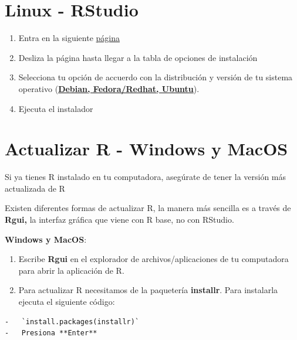 \documentclass[
  spanish,
  12pt,
  letterpaper,
  DIV=11,
  numbers=noendperiod]{scrreprt}
\providecommand{\tightlist}{%
  \setlength{\itemsep}{0pt}\setlength{\parskip}{0pt}}
\begin{document}
\section{Linux - RStudio}\label{linux---rstudio}

\begin{enumerate}
\def\labelenumi{\arabic{enumi}.}
\tightlist
\item
  Entra en la siguiente
  \href{https://posit.co/download/rstudio-desktop/\#download}{página}
\item
  Desliza la página hasta llegar a la tabla de opciones de instalación
\item
  Selecciona tu opción de accuerdo con la distribución y versión de tu
  sistema operativo (\ul{\textbf{Debian, Fedora/Redhat, Ubuntu}}).
\item
  Ejecuta el instalador
\end{enumerate}

\section{Actualizar R - Windows y
MacOS}\label{actualizar-r---windows-y-macos}

Si ya tienes R instalado en tu computadora, asegúrate de tener la
versión más actualizada de R

Existen diferentes formas de actualizar R, la manera más sencilla es a
través de \textbf{Rgui,} la interfaz gráfica que viene con R base, no
con RStudio.

\textbf{Windows y MacOS}:

\begin{enumerate}
\def\labelenumi{\arabic{enumi}.}
\item
  Escribe \textbf{Rgui} en el explorador de archivos/aplicaciones de tu
  computadora para abrir la aplicación de R.
\item
  Para actualizar R necesitamos de la paquetería \textbf{installr}. Para
  instalarla ejecuta el siguiente código:
\end{enumerate}

\begin{verbatim}
-   `install.packages(installr)`
-   Presiona **Enter**
\end{verbatim}
\end{document}
